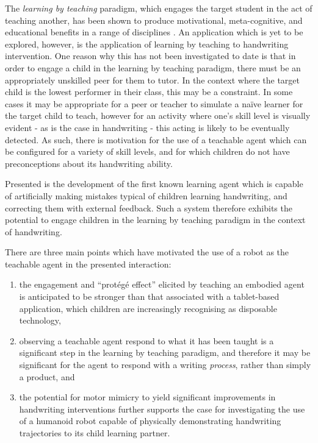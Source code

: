\documentclass{sig-alternate}
\begin{document}
The \emph{learning by teaching} paradigm, which engages the target student in
the act of teaching another, has been shown to produce motivational,
meta-cognitive, and educational benefits in a range of disciplines
\cite{Rohrbeck2003}. An application which is yet to be explored, however, is the
application of learning by teaching to handwriting intervention. One reason why
this has not been investigated to date is that in order to engage a child in the
learning by teaching paradigm, there must be an appropriately unskilled peer for
them to tutor. In the context where the target child is the lowest performer in
their class, this may be a constraint. In some cases it may be appropriate for a
peer or teacher to simulate a na\"ive learner for the target child to teach,
however for an activity where one's skill level is visually evident - as is the
case in handwriting - this acting is likely to be eventually detected. As such,
there is motivation for the use of a teachable agent which can be configured for
a variety of skill levels, and for which children do not have preconceptions
about its handwriting ability.

Presented is the development of the first known learning agent which is capable
of artificially making mistakes typical of children learning handwriting, and
correcting them with external feedback. Such a system therefore exhibits the potential
to engage children in the learning by teaching paradigm in the context of
handwriting. 

There are three main points which have motivated the use of a robot as the
teachable agent in the presented interaction:

\begin{enumerate}
    \item the engagement and ``protégé effect'' elicited by teaching an embodied
        agent is anticipated to be stronger than that associated with a
        tablet-based application, which children are increasingly recognising as
        disposable technology,

    \item observing a teachable agent respond to what it has been taught
        \cite{Okita2006} is a significant step in the learning by teaching
        paradigm, and therefore it may be significant for the agent to respond
        with a writing \emph{process}, rather than simply a product, and

    \item the potential for motor mimicry to yield significant improvements in
        handwriting interventions \cite{Berninger1997} further supports the case
        for investigating the use of a humanoid robot capable of physically
        demonstrating handwriting trajectories to its child learning partner.
\end{enumerate}
\end{document}
